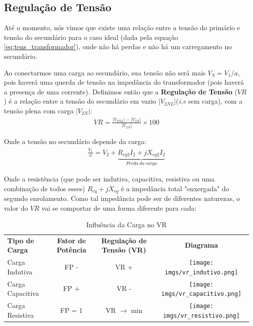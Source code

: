 \documentclass{article}
\begin{document}
\newpage
\subsection{Regulação de Tensão}
Até o momento, nós vimos que existe uma relação entre a tensão do primário e tensão do secundário para o caso ideal (dada pela equação \ref{eq:tens_transformador}), onde não há perdas e não há um carregamento no secundário.

Ao conectarmos uma carga ao secundário, sua tensão não será mais $V_S = V_1/a$, pois haverá uma querda de tensão na impedância do transformador (pois haverá a presença de uma corrente). Definimos então que a \textbf{Regulação de Tensão} ($VR$) é a relação entre a tensão do secundário em vazio $|V_{2NL}|$(\emph{i.e} sem carga), com a tensão plena com carga $|V_{2N}|$:
\begin{align}
    VR = \frac{|V_{2NL}| - |V_{2N}|}{|V_{2N}|}\times 100%
\end{align}

Onde a tensão no secundário depende da carga:
\begin{align}
    \frac{V_1}{a} = V_2 + \underbrace{R_{eq2}I_2 + jX_{eq2}I_2}_{Perda \ da \ carga}
\end{align}

Onde a resistência (que pode ser indutiva, capacitiva, resistiva ou uma combinação de todos esses) $R_{eq} + jX_{eq}$ é a impedância total "enxergada" do segundo enrolamento. Como tal impedância pode ser de diferentes naturezas, o valor do $VR$ vai se comportar de uma forma diferente para cada:

\begin{table}[h]
    \centering
    \begin{tabular}{l c c c}
        \textbf{Tipo de Carga} & \textbf{Fator de Potência} & \textbf{Regulação de Tensão (VR)} & \textbf{Diagrama} \\ 
        Carga Indutiva & FP -  &  VR + & 
        
        \begin{minipage}{0.3\textwidth}
            \centering
            \texttt{[image: imgs/vr\_indutivo.png]}
        \end{minipage} 
        
        \\
        Carga Capacitiva & FP +  &  VR - &  \begin{minipage}{0.3\textwidth}
            \centering
            \texttt{[image: imgs/vr\_capacitivo.png]}
        \end{minipage}\\
        Carga Resistiva & FP = 1  &  VR $\rightarrow$ min & \begin{minipage}{0.3\textwidth}
            \centering
            \texttt{[image: imgs/vr\_resistivo.png]}
        \end{minipage}\\
    \end{tabular}
    \caption{Influência da Carga no VR}
    \label{tab:vr_carga}
\end{table}
\end{document}
